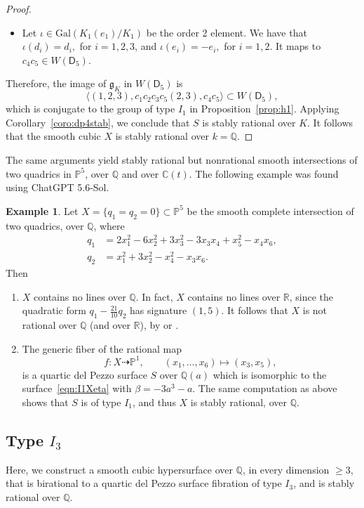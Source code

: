 \documentclass[12pt, reqno]{amsart}
\theoremstyle{plain}
\theoremstyle{remark}
\theoremstyle{definition}
\newtheorem{exam}[prop]{Example}
\numberwithin{equation}{section}
\def\sD{{\mathsf D}}
\def\bP{{\mathbb P}}
\def\bQ{{\mathbb Q}}
\def\bR{{\mathbb R}}
\def\bC{{\mathbb C}}
\def\Gal{\mathrm{Gal}}
\begin{document}
\begin{proof}
\begin{itemize}
    \item Let $\iota\in \Gal(K_1(e_1)/K_1)$ be the order 2 element. We have that $\iota(d_i)=d_i,$ for $i=1,2,3$, and $\iota(e_i)=-e_i, $ for $i=1,2.$ It maps to $c_4c_5\in W(\sD_5)$.
\end{itemize}
Therefore, the image of $\mathfrak g_K$ in $W(\sD_5)$ is 
$$
\langle (1,2,3),c_1c_2c_3c_5(2,3),c_4c_5\rangle\subset W(\sD_5),
$$
which is conjugate to the group of type $I_1$ in Proposition~\ref{prop:h1}. Applying Corollary~\ref{coro:dp4stab}, we conclude that $S$ is stably rational over $K$. It follows that the smooth cubic $X$ is stably rational over $k=\bQ$.
\end{proof}

The same arguments yield stably rational but nonrational smooth intersections of two quadrics in $\bP^5$, over $\bQ$ and over $\bC(t)$. The following example was found using ChatGPT 5.6-Sol. 

\begin{exam}
\label{exam:x22}
Let $X=\{q_1=q_2=0\}\subset \bP^5$ be the smooth complete intersection of two quadrics, over $\bQ$, where
\begin{align*}
q_1&=2x_1^2-6x_2^2+3x_3^2-3x_3x_4+x_5^2-x_4x_6,
\\
q_2&=x_1^2+3x_2^2-x_4^2-x_3x_6.
\end{align*}
Then 
\begin{enumerate}
\item $X$ contains no lines over $\bQ$. In fact, $X$ contains no lines over $\bR$, since the quadratic form $q_1-\frac{21}{10}q_2$ has signature $(1,5)$. It follows that $X$ is not rational over $\bQ$ (and over $\bR$), by \cite{HT-quad} or \cite{BW}. 
\item The generic fiber of the rational map
\begin{equation*}
         f:X\dashrightarrow\bP^1,
         \qquad (x_1,\ldots,x_6)\mapsto(x_3,x_5),
\end{equation*}
is a quartic del Pezzo surface $S$ over $\bQ(a)$ which is isomorphic to the surface~\eqref{eqn:I1Xeta} with $\beta=-3a^3-a$. The same computation as above shows that $S$ is of type $I_1$, and thus $X$ is stably rational, over $\bQ$. 
\end{enumerate}
\end{exam}

\subsection*{Type $I_3$} Here, we construct a smooth cubic hypersurface over $\bQ$, in every dimension $\ge 3$, that is birational to a quartic del Pezzo surface fibration of type $I_3$, and is stably rational over $\bQ$.
\end{document}
